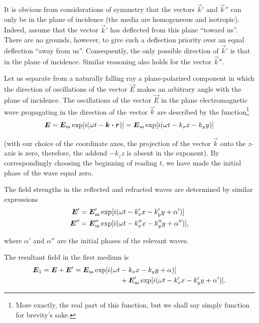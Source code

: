 It is obvious from considerations of symmetry that the vectors $\vec{k}'$ and $\vec{k}''$ can only be in the plane of incidence (the media are homogeneous and isotropic).
Indeed, assume that the vector $\vec{k}'$ has deflected from this plane ``toward us''.
There are no grounds, however, to give such a deflection priority over an equal deflection ``away from us''.
Consequently, the only possible direction of $\vec{k}'$ is that in the plane of incidence. Similar reasoning also holds for the vector $\vec{k}''$.

Let us separate from a naturally falling ray a plane-polarized component in which the direction of oscillations of the vector $\vec{E}$ makes an arbitrary angle with the plane of incidence.
The oscillations of the vector $\vec{E}$ in the plane electromagnetic wave propagating in the direction of the vector $\vec{k}$ are described by the function\footnote{More exactly, the real part of this function, but we shall say simply function for brevity's sake.}
\begin{equation*}
    \boldsymbol{E} = \boldsymbol{E}_{\text{m}} \exp[i (\omega t - \boldsymbol{k\cdot r})] = \boldsymbol{E}_{\text{m}} \exp[i (\omega t - k_x x - k_y y)]
\end{equation*}

\noindent
(with our choice of the coordinate axes, the projection of the vector $\vec{k}$ onto the $z$-axis is zero, therefore, the addend $-k_zz$ is absent in the exponent).
By correspondingly choosing the beginning of reading $t$, we have made the initial phase of the wave equal zero.

The field strengths in the reflected and refracted waves are determined by similar expressions
\begin{align*}
    \boldsymbol{E}' &= \boldsymbol{E}_{\text{m}}' \exp[i (\omega t - k_x' x - k_y' y + \alpha')]\\
    \boldsymbol{E}'' &= \boldsymbol{E}_{\text{m}}'' \exp[i (\omega t - k_x'' x - k_y'' y + \alpha'')],
\end{align*}

\noindent
where $\alpha'$ and $\alpha''$ are the initial phases of the relevant waves.

The resultant field in the first medium is
\begin{align}
    \boldsymbol{E}_1 = \boldsymbol{E} + \boldsymbol{E}' = \boldsymbol{E}_{\text{m}} \exp[i (\omega t &- k_x x - k_y y + \alpha)] \nonumber\\
    &+ \boldsymbol{E}_{\text{m}}' \exp[i (\omega t - k_x' x - k_y' y + \alpha')].\label{eq:16_18}
\end{align}

